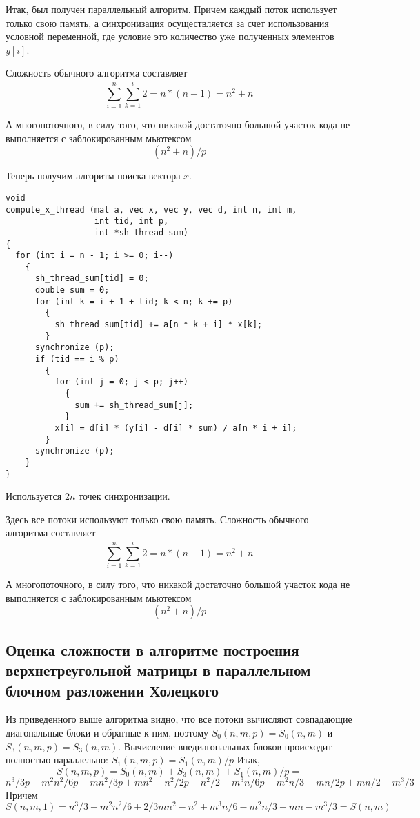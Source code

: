 \documentclass[a4paper, 12pt]{article}
\begin{document}
Итак, был получен параллельный алгоритм. Причем каждый
поток использует только свою память, а синхронизация осуществляется
за счет использования условной переменной, где условие 
это количество уже полученных элементов $y[i]$.

Сложность обычного алгоритма составляет
$$\sum_{i=1}^n\sum_{k=1}^i2 = n*(n+1)=n^2+n$$

А многопоточного, в силу того, что никакой достаточно 
большой участок кода
не выполняется с заблокированным мьютексом
$$(n^2+n)/p$$

Теперь получим алгоритм поиска вектора $x$.
\begin{verbatim}
void
compute_x_thread (mat a, vec x, vec y, vec d, int n, int m,
                  int tid, int p,
                  int *sh_thread_sum)
{
  for (int i = n - 1; i >= 0; i--)
    {
      sh_thread_sum[tid] = 0;
      double sum = 0;
      for (int k = i + 1 + tid; k < n; k += p)
        {
          sh_thread_sum[tid] += a[n * k + i] * x[k];
        }
      synchronize (p);
      if (tid == i % p)
        {
          for (int j = 0; j < p; j++)
            {
              sum += sh_thread_sum[j];
            }
          x[i] = d[i] * (y[i] - d[i] * sum) / a[n * i + i];
        }
      synchronize (p);
    }
}
\end{verbatim}
Используется $2n$ точек синхронизации.


Здесь все потоки используют только свою память.
Сложность обычного алгоритма составляет
$$\sum_{i=1}^n\sum_{k=1}^i2 = n*(n+1)=n^2+n$$

А многопоточного, в силу того, что никакой достаточно 
большой участок кода
не выполняется с заблокированным мьютексом
$$(n^2+n)/p$$

\subsection{Оценка сложности в алгоритме построения верхнетреугольной матрицы
в параллельном блочном разложении Холецкого}

Из приведенного выше алгоритма
видно, что все потоки вычисляют совпадающие диагональные блоки
 и обратные к ним, поэтому 
 $S_0(n,m,p) = S_0(n,m)$ и $S_3(n,m,p) = S_3(n,m)$.
 Вычисление внедиагональных блоков происходит полностью параллельно:
 $S_1(n,m,p) = S_1(n,m)/p$
 \newline
 Итак, 
 $$S(n,m,p) = S_0(n,m)+S_3(n,m)+S_1(n,m)/p =$$
 $$ 
 n^3/3p- m^2n^2/6p- mn^2/3p+mn^2- n^2/2p- n^2/2 + m^3n/6p
 -m^2n/3 + mn/2p + mn/2 
 -m^3/3 
    $$
Причем $$S(n,m,1) =n^3/3-m^2n^2/6+2/3mn^2-n^2+m^3n/6-m^2n/3
+mn-m^3/3 = S(n,m)$$
\end{document}
